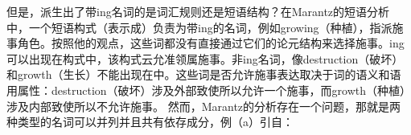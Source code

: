     但是，派生出了带ing名词的是词汇规则还是短语结构？在Marantz的\citeyearpar{Marantz97a}短语分析中，一个短语构式（表示成\vPc）负责为带ing的名词，例如growing（种植），指派施事角色。按照他的观点，这些词都没有直接通过它们的论元结构来选择施事。ing可以出现在\vPc 构式中，该构式云允准领属施事。非ing名词，像destruction（破坏）和growth（生长）不能出现在\vPc 中。这些词是否允许施事表达取决于词的语义和语用属性：destruction（破坏）涉及外部致使所以允许一个施事，而growth（种植）涉及内部致使所以不允许施事。
\addlines
    然而，Marantz的分析存在一个问题，那就是两种类型的名词可以并列并且共有依存成分，例（a）引自：

